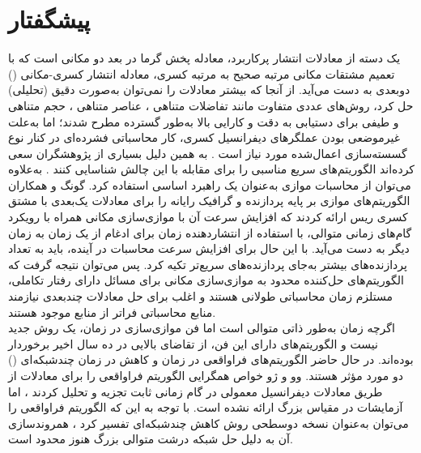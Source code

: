 \chapter*{پیشگفتار}
\thispagestyle{empty}
یک دسته از معادلات انتشار پرکاربرد، معادله پخش گرما در بعد دو مکانی است که با تعمیم مشتقات مکانی مرتبه صحیح به مرتبه کسری، معادله انتشار کسری-مکانی
()
دوبعدی به دست می‌آید.
از آنجا که بیشتر معادلات
را نمی‌توان به‌صورت دقیق (تحلیلی) حل کرد، روش‌های عددی متفاوت مانند تفاضلات متناهی
\cite{Ref4DXL, Ref9HFCS, Ref14FZLTAL, Ref15CDL}،
عناصر متناهی
\cite{Ref21BTY, Ref24BTWY, Ref25YYNWZL, Ref26ZBZT, Ref28BSYXZ}،
حجم متناهی
\cite{Ref30LZTBA, Ref31JW}
و طیفی
\cite{Ref33SX, Ref34Y}
برای دستیابی به دقت و کارایی بالا به‌طور گسترده مطرح شدند؛ اما به‌علت غیرموضعی بودن عملگرهای دیفرانسیل کسری، کار محاسباتی فشرده‌ای در کنار نوع گسسته‌سازی اعمال‌شده مورد نیاز است
\cite{Ref42GBTJL}.
به همین دلیل بسیاری از پژوهشگران سعی کرده‌اند الگوریتم‌های سریع مناسبی را برای مقابله با این چالش شناسایی کنند
\cite{Ref43PS, Ref48CLZ}.
به‌علاوه می‌توان از محاسبات موازی به‌عنوان یک راهبرد اساسی استفاده کرد.
گونگ
و همکاران الگوریتم‌های موازی بر پایه پردازنده و گرافیک رایانه را برای معادلات
يک‌‌بعدی با مشتق کسری
ریس
ارائه کردند
\cite{Ref49GBT, Ref50WLGZX}
که افزایش سرعت‌ آن با موازی‌سازی مکانی همراه با رویکرد گام‌های زمانی متوالی، با استفاده از انتشاردهنده زمان برای ادغام از یک زمان به زمان دیگر به ‌دست‌ می‌آید.
با این ‌حال برای افزایش سرعت محاسبات در آینده، باید به تعداد پردازنده‌های بیشتر به‌جای پردازنده‌های سریع‌تر تکیه کرد.
پس می‌توان نتیجه گرفت که الگوریتم‌های حل‌کننده محدود به موازی‌سازی مکانی برای مسائل دارای رفتار تکاملی، مستلزم زمان محاسباتی طولانی هستند و اغلب برای حل معادلات
چندبعدی نیازمند منابع محاسباتی فراتر از منابع موجود هستند.
\\
اگرچه زمان به‌طور ذاتی متوالی است اما فن ﻣﻮﺍﺯﯼﺳﺎﺯﯼ ﺩﺭ ﺯﻣﺎﻥ، یک روش ﺟﺪﯾﺪ نیست و الگوریتم‌های دارای این فن، از تقاضای بالایی در ده سال اخیر برخوردار بوده‌اند.
در حال حاضر الگوریتم‌های فراواقعی در زمان
\cite{Ref51LMT}
و کاهش در زمان چندشبکه‌ای
()
\cite{Ref52FFKMS}
دو مورد مؤثر هستند.
وو
و
ژو
خواص همگرایی الگوریتم فراواقعی را برای معادلات
از طریق معادلات دیفرانسیل معمولی در گام‌ زمانی ثابت تجزیه و تحلیل کردند
\cite{Ref54WZ}،
اما آزمایشات در مقیاس بزرگ ارائه نشده‌ است.
با توجه به‌ این‌ که الگوریتم فراواقعی را می‌توان به‌عنوان نسخه دوسطحی روش کاهش چندشبکه‌ای تفسیر کرد
\cite{Ref52FFKMS, Ref55GV}،
همروندسازی آن به دلیل حل شبکه درشت متوالی بزرگ هنوز محدود است.
